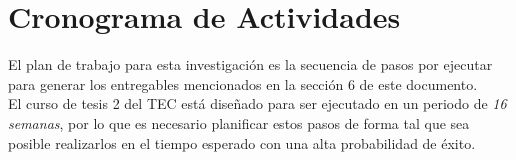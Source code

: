 \section{\textbf{Cronograma de Actividades}}
El plan de trabajo para esta investigaci\'on es la secuencia de pasos por ejecutar
para generar los entregables mencionados en la secci\'on 6 de este documento.\\
El curso de tesis 2 del TEC est\'a dise\~nado para ser ejecutado en un periodo de \textit{16 semanas}, por lo que es necesario planificar estos pasos de forma tal que sea posible realizarlos en el tiempo esperado con una alta probabilidad de \'exito.